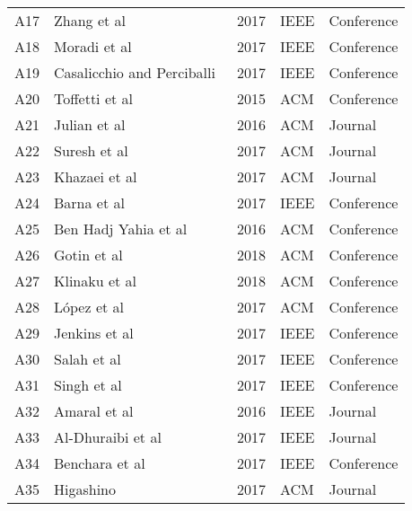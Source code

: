 \begin{table*}[htbp]
\begin{tabular}{l@{\hspace{4em}}l@{\hspace{4em}}l@{\hspace{4em}}l@{\hspace{4em}}l}
A17 & Zhang et al~\cite{Zhang2017} & 2017 & IEEE          & Conference        \\
A18 & Moradi et al~\cite{Moradi2017} & 2017 & IEEE          & Conference        \\
A19 & Casalicchio and Perciballi~\cite{Casalicchio2017} & 2017 & IEEE          & Conference        \\
A20 & Toffetti et al~\cite{Toffetti2015} & 2015 & ACM           & Conference        \\
A21 & Julian et al~\cite{Julian2016} & 2016 & ACM           & Journal           \\
A22 & Suresh et al~\cite{Suresh2017} & 2017 & ACM           & Journal           \\
A23 & Khazaei et al~\cite{Khazaei2017} & 2017 & ACM           & Journal           \\
A24 & Barna et al~\cite{Barna2017} & 2017 & IEEE          & Conference        \\
A25 & Ben Hadj Yahia et al~\cite{BenHadjYahia2016} & 2016 & ACM           & Conference        \\
A26 & Gotin et al~\cite{Gotin2018} & 2018 & ACM           & Conference        \\
A27 & Klinaku et al~\cite{Klinaku2018} & 2018 & ACM           & Conference        \\
A28 & López et al~\cite{Lopez2017} & 2017 & ACM           & Conference        \\
A29 & Jenkins et al~\cite{Jenkins2017} & 2017 & IEEE & Conference        \\
A30 & Salah et al~\cite{Salah2017} & 2017 & IEEE          & Conference        \\
A31 & Singh et al~\cite{Singh2017} & 2017 & IEEE          & Conference        \\
A32 & Amaral et al~\cite{Amaral2016} & 2016 & IEEE          & Journal           \\
A33 & Al-Dhuraibi et al~\cite{Al-Dhuraibi2017} & 2017 & IEEE          & Journal           \\
A34 & Benchara et al~\cite{Benchara2017} & 2017 & IEEE          & Conference        \\ 
A35 & Higashino~\cite{Higashino2017ApplicationArchitecture} & 2017 & ACM          & Journal        \\ \hline
\end{tabular}
\end{table*}